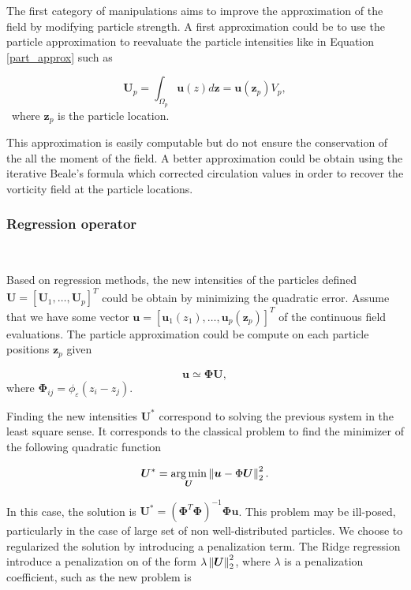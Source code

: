 The first category of manipulations aims to improve the approximation of the field by modifying particle strength.
A first approximation could be to use the particle approximation to reevaluate the particle intensities like in Equation \ref{part_approx} such as

\begin{equation*}
	\bm U_p = \int_{\Omega_p} \bm u(z) d\bm z = \bm u(\bm z_p) V_p,
\end{equation*}~where $\bm z_p$ is the particle location.

This approximation is easily computable but do not ensure the conservation of the all the moment of the field. A better approximation could be obtain using the iterative Beale's formula \cite{beale_accuracy_1988} which corrected circulation values in order to recover the vorticity field at the particle locations.

\subsubsection{Regression operator}~\label{regressionOperator}

Based on regression methods, the new intensities of the particles defined $\bm{U} = [\bm U_1, \dots, \bm U_p]^T$ could be obtain by minimizing the quadratic error. Assume that we have some vector $\bm{u} = [\bm u_1(z_1), \dots, \bm u_p(\bm z_p)]^T$ of the continuous field evaluations. The particle approximation could be compute on each particle positions $\bm z_p$ given

\begin{equation*}
	\bm{u} \simeq \bm \Phi \bm{U},
\end{equation*}where $\bm \Phi_{ij} = \phi_\varepsilon(z_i - z_j)$.

Finding the new intensities $\bm U^*$ correspond to solving the previous system in the least square sense. It corresponds to the classical problem to find the minimizer of the following quadratic function

\begin{equation*}
	\bm{U}^*= \operatorname*{arg\,min}_{\bm{U}} \left\lVert \bm{u} - \Phi \bm{U} \right\rVert^2_2.
\end{equation*}


In this case, the solution is $\bm U^*  = (\bm \Phi^T \bm \Phi)^{-1} \bm \Phi \bm{u}$. This problem may be ill-posed, particularly in the case of large set of non well-distributed particles. We choose to regularized the solution by introducing a penalization term. The Ridge regression introduce a penalization on of the form $\lambda \left\lVert \bm U \right\rVert_2^2$, where $\lambda$ is a penalization coefficient, such as the new problem is

